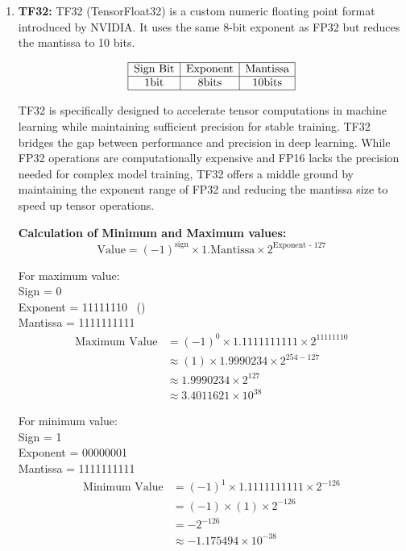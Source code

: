 \begin{enumerate}[label=\textbf{\roman*.}]
    \item \textbf{TF32:}
    TF32 (TensorFloat32) is a custom numeric floating point format introduced by NVIDIA. It uses the same 8-bit exponent as FP32 but reduces the mantissa to 10 bits.

    \[
    \begin{array}{|c|c|c|}
        \hline
        \text{Sign Bit} & \text{Exponent} & \text{Mantissa} \\
        \hline
        1 \text{bit} & 8 \text{bits} & 10 \text{bits} \\
        \hline
    \end{array}
    \]

    TF32 is specifically designed to accelerate tensor computations in machine learning while maintaining sufficient precision for stable training. TF32 bridges the gap between performance and precision in deep learning. While FP32 operations are computationally expensive and FP16 lacks the precision needed for complex model training, TF32 offers a middle ground by maintaining the exponent range of FP32 and reducing the mantissa size to speed up tensor operations.

    
    \textbf{Calculation of Minimum and Maximum values:} 
    \[
        \text{Value} = (-1)^{\text{sign}} \times 1.\text{Mantissa} \times 2^{\text{Exponent - 127}}
    \]

    For maximum value:\\
    Sign = 0 \\
    Exponent = 11111110 \ () \\
    Mantissa = 1111111111
    \[
        \begin{aligned}
            \text{Maximum Value} &= (-1)^{0} \times 1.1111111111 \times 2^{11111110} \\
            & \approx (1) \times 1.9990234 \times 2^{254 - 127} \\
            & \approx 1.9990234 \times 2^{127} \\
            & \approx 3.4011621 \times 10^{38}
        \end{aligned}
    \]

    For minimum value:\\

    Sign = 1 \\
    Exponent = 00000001 \\
    Mantissa = 1111111111
    \[
        \begin{aligned}
            \text{Minimum Value} &= (-1)^{1} \times 1.1111111111 \times 2^{-126} \\
            & = (-1) \times (1) \times 2^{-126} \\
            & =  -2^{-126} \\
            & \approx -1.175494 \times 10^{-38}
        \end{aligned}
    \]


\end{enumerate}
